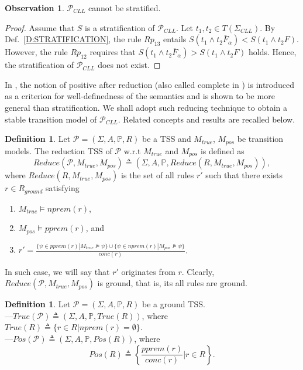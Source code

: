 \documentclass{elsarticle}
\theoremstyle{plain}
\theoremstyle{definition}
\newtheorem{mydefn}[theorem]{Definition}
\newtheorem{observation}[theorem]{Observation}
\begin{document}
\begin{observation}
 ${\mathcal P}_{CLL}$ cannot be stratified.
\end{observation}
\begin{proof}
    Assume that $S$ is a stratification of ${\mathcal P}_{CLL}$. Let $t_1,t_2 \in T(\Sigma_{CLL})$. By Def.~\ref{D:STRATIFICATION}, the rule $Rp_{13}$ entails $S(t_1\wedge t_2\overline{F}_{\alpha})<S(t_1\wedge t_2 F)$. However, the rule $Rp_{12}$ requires that $S(t_1\wedge t_2\overline{F}_{\alpha})>S(t_1\wedge t_2 F)$ holds. Hence, the stratification of ${\mathcal P}_{CLL}$ does not exist.
\end{proof}

In \cite{Bol96}, the notion of positive after reduction (also called complete in \cite{Glabbeek04}) is introduced as a criterion for well-definedness of the semantics and is shown to be more general than stratification.
We shall adopt such reducing technique to obtain a stable transition model of ${\mathcal P}_{CLL}$.
Related concepts and results are recalled below.

\begin{mydefn}\label{D:REDUCTION}
    Let $\mathcal{P}=(\Sigma,A,\mathbb{P},R)$ be a TSS and $M_{true}$, $M_{pos}$ be transition models. The reduction TSS of $\mathcal P$ w.r.t $M_{true}$ and $M_{pos}$ is defined as
    \[Reduce({\mathcal P},M_{true},M_{pos})\triangleq(\Sigma,A,{\mathbb P},Reduce(R,M_{true},M_{pos})),\]
    where $Reduce(R,M_{true},M_{pos})$ is the set of all rules $r'$ such that there exists $r\in R_{ground}$ satisfying
    \begin{enumerate}
      \item $M_{true}\models nprem(r)$,
      \item $M_{pos}\models pprem(r)$, and
      \item $r'=\frac{\{\psi \in pprem(r)|M_{true}\not\models\psi\}\cup\{\psi\in nprem(r)| M_{pos} \not \models \psi\}} {conc(r)}$.
    \end{enumerate}
    In such case, we will say that $r'$ originates from $r$. Clearly,
    $Reduce({\mathcal P},M_{true},M_{pos})$ is ground, that is, its all rules are ground.
\end{mydefn}


\begin{mydefn}
    Let $\mathcal{P}=(\Sigma,A,\mathbb{P},R)$ be a ground TSS.\\
    ---$True({\mathcal P})\triangleq(\Sigma,A,\mathbb{P},True(R))$, where $True(R)\triangleq\{r\in R|nprem(r)=\emptyset\}$.\\
    ---$Pos({\mathcal P})\triangleq(\Sigma,A,\mathbb{P},Pos(R))$, where
    \[Pos(R)\triangleq\left\{\frac{pprem(r)}{conc(r)}| r\in R\right\}.
    \]
\end{mydefn}
\end{document}
